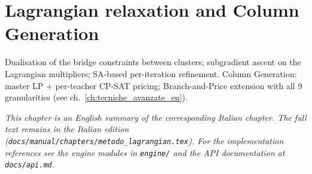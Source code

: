 \chapter{Lagrangian relaxation and Column Generation}
\label{ch:metodo_lagrangian_en}

Dualisation of the bridge constraints between clusters; subgradient ascent on the Lagrangian multipliers; SA-based per-iteration refinement. Column Generation: master LP + per-teacher CP-SAT pricing; Branch-and-Price extension with all 9 granularities (see ch.~\ref{ch:tecniche_avanzate_en}).

\medskip
\noindent
\textit{This chapter is an English summary of the corresponding Italian chapter. The full text remains in the Italian edition (\texttt{docs/manual/chapters/metodo\_lagrangian.tex}). For the implementation references see the engine modules in \texttt{engine/} and the API documentation at \texttt{docs/api.md}.}
